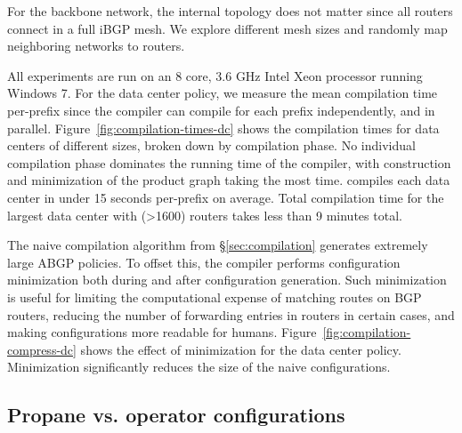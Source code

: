 For the backbone network, the internal topology does not matter since all routers connect in a full iBGP mesh. We explore different mesh sizes and randomly map neighboring networks to routers.

All experiments are run on an 8 core, 3.6 GHz Intel Xeon processor running Windows 7.
%
For the data center policy, we measure the mean compilation time per-prefix since the \sysname compiler can compile for each prefix independently, and in parallel. Figure~\ref{fig:compilation-times-dc} shows the compilation times for data centers of different sizes, broken down by compilation phase. No individual compilation phase dominates the running time of the compiler, with construction and minimization of the product graph taking the most time. \sysname compiles each data center in under 15 seconds per-prefix on average. Total compilation time for the largest data center with (>1600) routers takes less than 9 minutes total.

The naive compilation algorithm from \S\ref{sec:compilation} generates extremely large ABGP policies. To offset this, the compiler performs configuration minimization both during and after configuration generation. Such minimization is useful for limiting the computational expense of matching routes on BGP routers, reducing the number of forwarding entries in routers in certain cases, and making configurations more readable for humans. Figure~\ref{fig:compilation-compress-dc} shows the effect of minimization for the data center policy. Minimization significantly reduces the size of the naive configurations.


\subsection{Propane vs. operator configurations}

